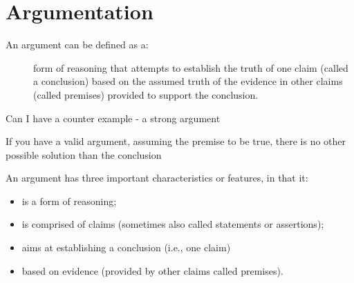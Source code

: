 \documentclass{article}
\begin{document}







\section{Argumentation}

\begin{description}
\item [An argument can be defined as a:] form of reasoning that attempts to establish the truth of one claim (called a conclusion) based on the assumed truth of the evidence in other claims (called premises) provided to support the conclusion.
\end{description}

Can I have a counter example - a strong argument

If you have a valid argument, assuming the premise to be true, there is no other possible solution than the conclusion


An argument has three important characteristics or features, in that it:

\begin{itemize}
  \item is a form of reasoning;
  \item is comprised of claims (sometimes also called statements or assertions);
  \item aims at establishing a conclusion (i.e., one claim)
  \item based on evidence (provided by other claims called premises).
\end{itemize}
\end{document}
